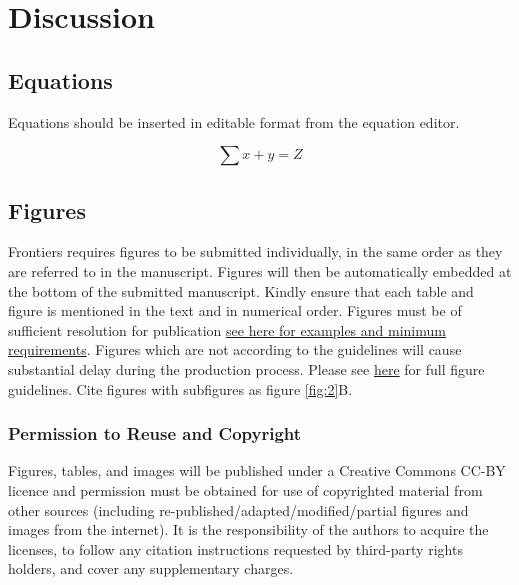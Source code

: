 \documentclass[utf8]{frontiersSCNS} %
\begin{document}
\section{Discussion}

\subsection{Equations}
Equations should be inserted in editable format from the equation editor.

\begin{equation}
\sum x+ y =Z\label{eq:01}
\end{equation}

\subsection{Figures}
Frontiers requires figures to be submitted individually, in the same order as they are referred to in the manuscript. Figures will then be automatically embedded at the bottom of the submitted manuscript. Kindly ensure that each table and figure is mentioned in the text and in numerical order. Figures must be of sufficient resolution for publication \href{http://home.frontiersin.org/about/author-guidelines#ResolutionRequirements}{see here for examples and minimum requirements}. Figures which are not according to the guidelines will cause substantial delay during the production process. Please see \href{http://home.frontiersin.org/about/author-guidelines#GeneralStyleGuidelinesforFigures}{here} for full figure guidelines. Cite figures with subfigures as figure \ref{fig:2}B.


\subsubsection{Permission to Reuse and Copyright}
Figures, tables, and images will be published under a Creative Commons CC-BY licence and permission must be obtained for use of copyrighted material from other sources (including re-published/adapted/modified/partial figures and images from the internet). It is the responsibility of the authors to acquire the licenses, to follow any citation instructions requested by third-party rights holders, and cover any supplementary charges.
\end{document}
